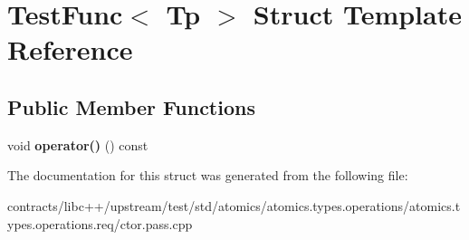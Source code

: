 \hypertarget{struct_test_func}{}\section{Test\+Func$<$ Tp $>$ Struct Template Reference}
\label{struct_test_func}
\subsection*{Public Member Functions}
\begin{DoxyCompactItemize}
\item 
\mbox{\label{struct_test_func_ad556f09a5b2b6e08fb04b8a80d223ef8}} 
void {\bfseries operator()} () const
\end{DoxyCompactItemize}


The documentation for this struct was generated from the following file\+:\begin{DoxyCompactItemize}
\item 
contracts/libc++/upstream/test/std/atomics/atomics.\+types.\+operations/atomics.\+types.\+operations.\+req/ctor.\+pass.\+cpp\end{DoxyCompactItemize}
